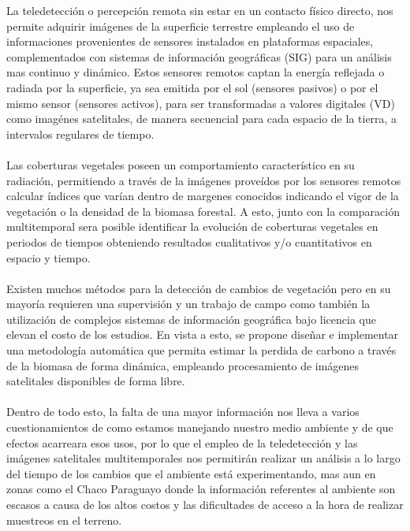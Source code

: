 La teledetecci\'on o percepci\'on remota sin estar en un contacto f\'isico directo, nos permite adquirir im\'agenes de la superficie terrestre\cite{lillesand1994remote} empleando el uso de informaciones provenientes de sensores instalados en plataformas espaciales, complementados con sistemas de informaci\'on geogr\'aficas (SIG) para un an\'alisis mas continuo y din\'amico. Estos sensores remotos captan la energ\'ia reflejada o radiada por la superficie, ya sea emitida por el sol (sensores pasivos) o por el mismo sensor (sensores activos), para ser transformadas a valores digitales (VD) como imag\'enes satelitales, de manera secuencial para cada espacio de la tierra, a intervalos regulares de tiempo.\\~\\
Las coberturas vegetales poseen un comportamiento caracter\'istico en su radiaci\'on, permitiendo a trav\'es de la im\'agenes prove\'idos por los sensores remotos calcular \'indices que var\'ian dentro de margenes conocidos indicando el vigor de la vegetaci\'on o la densidad de la biomasa forestal. A esto, junto con la comparaci\'on multitemporal sera posible identificar la evoluci\'on de coberturas vegetales en periodos de tiempos obteniendo resultados cualitativos y/o cuantitativos en espacio y tiempo\cite{martinez2013normalizacion}.\\~\\
Existen muchos m\'etodos para la detecci\'on de cambios de vegetaci\'on pero en su mayor\'ia requieren una supervisi\'on y un trabajo de campo como tambi\'en la utilizaci\'on de complejos sistemas de informaci\'on geogr\'afica bajo licencia que elevan el costo de los estudios. En vista a esto, se propone dise\~{n}ar e implementar una metodolog\'ia autom\'atica que permita estimar la perdida de carbono a trav\'es de la biomasa de forma din\'amica, empleando procesamiento de im\'agenes satelitales disponibles de forma libre.\\~\\
Dentro de todo esto, la falta de una mayor informaci\'on nos lleva a varios cuestionamientos de como estamos manejando nuestro medio ambiente y de que efectos acarreara esos usos, por lo que el empleo de la teledetecci\'on y las im\'agenes satelitales multitemporales nos permitir\'an realizar un an\'alisis a lo largo del tiempo de los cambios que el ambiente est\'a experimentando, mas aun en zonas como el Chaco Paraguayo donde la informaci\'on referentes al ambiente son escasos a causa de los altos costos y las dificultades de acceso a la hora de realizar muestreos en el terreno.

